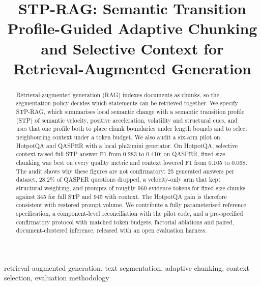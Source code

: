 \documentclass[conference,a4paper]{IEEEtran}
\begin{document}
\title{STP-RAG: Semantic Transition Profile-Guided Adaptive Chunking and Selective Context for Retrieval-Augmented Generation}

\author{
}

\maketitle

\begin{abstract}
Retrieval-augmented generation (RAG) indexes documents as chunks, so the segmentation policy decides which statements can be retrieved together. We specify STP-RAG, which summarises local semantic change with a semantic transition profile (STP) of semantic velocity, positive acceleration, volatility and structural cues, and uses that one profile both to place chunk boundaries under length bounds and to select neighbouring context under a token budget. We also audit a six-arm pilot on HotpotQA and QASPER with a local phi3:mini generator. On HotpotQA, selective context raised full-STP answer F1 from 0.283 to 0.410; on QASPER, fixed-size chunking was best on every quality metric and context lowered F1 from 0.105 to 0.068. The audit shows why these figures are not confirmatory: 25 generated answers per dataset, 28.2\% of QASPER questions dropped, a velocity-only arm that kept structural weighting, and prompts of roughly 960 evidence tokens for fixed-size chunks against 345 for full STP and 945 with context. The HotpotQA gain is therefore consistent with restored prompt volume. We contribute a fully parameterised reference specification, a component-level reconciliation with the pilot code, and a pre-specified confirmatory protocol with matched token budgets, factorial ablations and paired, document-clustered inference, released with an open evaluation harness.
\end{abstract}

\begin{IEEEkeywords}
retrieval-augmented generation, text segmentation, adaptive chunking, context selection, evaluation methodology
\end{IEEEkeywords}

\end{document}
